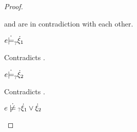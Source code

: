 \begin{proof}
\begin{byCases}
\begin{byCases}
\begin{byCases}
             and  are in contradiction with each other.
        \item[\text{(\ref{rule:CMSOr1})}]
            \begin{pfsteps*}
            \item $e \dot{\models}_{?} \dot{\xi}_1$ 
            \end{pfsteps*}
            Contradicts .
        \item[\text{(\ref{rule:CMSOr2})}]
            \begin{pfsteps*}
            \item $e \dot{\models}_{?} \dot{\xi}_2$ 
            \end{pfsteps*}
            Contradicts .
        \end{byCases}
        \begin{pfsteps*}
        \item $\cnotmaysatisfy{e}{\cor{\hxi_1}{\hxi_2}}$ 
        \end{pfsteps*}
        

\end{byCases}
\end{byCases}
\end{proof}
